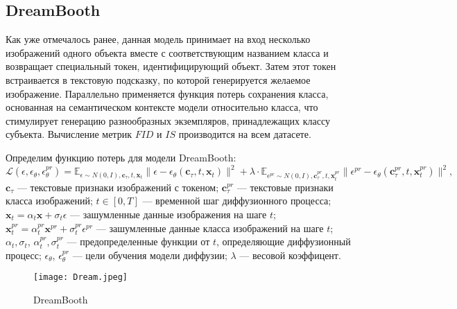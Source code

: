 \documentclass{article}
\begin{document}
\subsection{DreamBooth}
Как уже отмечалось ранее, данная модель принимает на вход несколько изображений одного объекта вместе с соответствующим названием класса и возвращает специальный токен, идентифицирующий объект. Затем этот токен встраивается в текстовую подсказку, по которой генерируется желаемое изображение. Параллельно применяется функция потерь сохранения класса, основанная на семантическом контексте модели относительно класса, что стимулирует генерацию разнообразных экземпляров, принадлежащих классу субъекта. Вычисление метрик $FID$ и $IS$ производится на всем датасете.\par
Определим функцию потерь для модели DreamBooth:
\begin{equation}
\mathcal{L}(\epsilon, \epsilon_{\theta}, \epsilon^{pr}_{\theta}) = \mathbb{E}_{\epsilon \sim N(0, I),\mathbf{c}_{\tau}, t, \mathbf{x}_{t}} \|\epsilon - \epsilon_{\theta}(\mathbf{c}_{\tau}, t, \mathbf{x}_{t})\|^2 + \lambda \cdot \mathbb{E}_{\epsilon^{pr} \sim N(0, I),\mathbf{c}^{pr}_{\tau}, t, \mathbf{x}^{pr}_{t}} \|\epsilon^{pr} - \epsilon_{\theta}(\mathbf{c}^{pr}_{\tau}, t, \mathbf{x}^{pr}_{t})\|^2,
\end{equation}
$\mathbf{c}_{\tau}$ --- текстовые признаки изображений с токеном; $\mathbf{c}^{pr}_{\tau}$ --- текстовые признаки класса изображений; $t \in [0, T]$ --- временной шаг диффузионного процесса; $\mathbf{x}_{t} = \alpha_t \mathbf{x}  + \sigma_t \epsilon$ --- зашумленные данные изображения на шаге $t$; $\mathbf{x}^{pr}_{t} = \alpha_t^{pr} \mathbf{x}^{pr}  + \sigma_t^{pr} \epsilon^{pr}$ --- зашумленные данные класса изображений на шаге $t$; $\alpha_t, \sigma_t$, $\alpha^{pr}_t, \sigma^{pr}_t$ --- предопределенные функции от $t$, определяющие диффузионный процесс; $\epsilon_{\theta}$, $\epsilon^{pr}_{\theta}$ --- цели обучения модели диффузии; $\lambda$ --- 
весовой коэффицент.

\begin{figure}[H]
    \centering
    \texttt{[image: Dream.jpeg]}
    \caption{DreamBooth}
    \label{fig:simple}
\end{figure}
\end{document}
